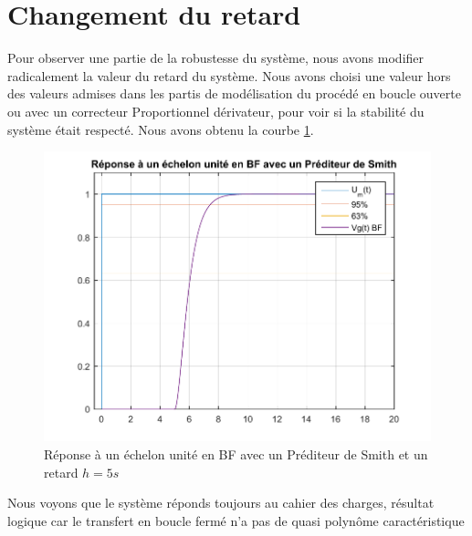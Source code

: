 \section{Changement du retard} 
Pour observer une partie de la robustesse du système, nous avons modifier radicalement la valeur du retard du système. Nous avons choisi une valeur hors des valeurs admises dans les partis de modélisation du procédé en boucle ouverte ou avec un correcteur Proportionnel dérivateur, pour voir si la stabilité du système était respecté. Nous avons obtenu la courbe \ref{fig:rep_echeonSmith5}. \begin{figure}[!ht]
\centering
\includegraphics[width = .7\textwidth]{./IV/images/rep_echelonSmith_h5.pdf}
\caption{Réponse à un échelon unité en BF avec un Préditeur de Smith et un retard $h=5s$}\label{fig:rep_echeonSmith5}
\end{figure}
Nous voyons que le système réponds toujours au cahier des charges, résultat logique car le transfert en boucle fermé n'a pas de quasi polynôme caractéristique